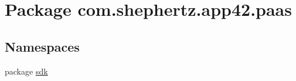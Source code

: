 \hypertarget{namespacecom_1_1shephertz_1_1app42_1_1paas}{\section{Package com.\+shephertz.\+app42.\+paas}
\label{namespacecom_1_1shephertz_1_1app42_1_1paas}
}
\subsection*{Namespaces}
\begin{DoxyCompactItemize}
\item 
package \hyperlink{namespacecom_1_1shephertz_1_1app42_1_1paas_1_1sdk}{sdk}
\end{DoxyCompactItemize}
